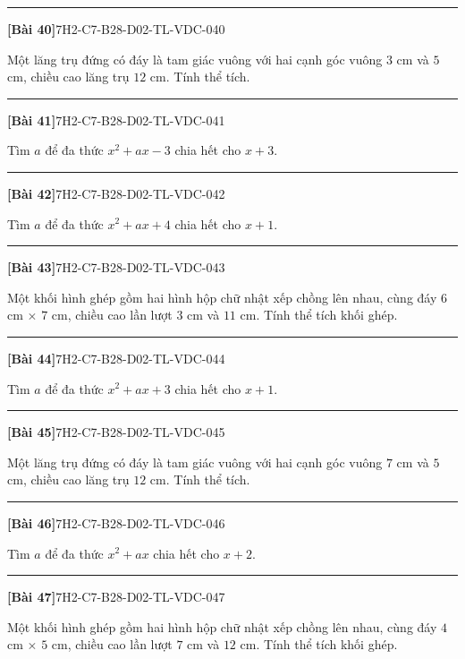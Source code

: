 \documentclass[12pt,a4paper]{article}
\newif\ifloigiai
\newenvironment{cauhoi}[2]{%
  \par\medskip\noindent\rule{\textwidth}{0.4pt}\par\nopagebreak
  \noindent\textbf{[#1]}\hfill{\scriptsize\ttfamily #2}\par\nopagebreak\smallskip}{\par}
\newcommand{\loigiai}[1]{\ifloigiai\par\smallskip\noindent\textit{Lời giải.} #1\par\fi}
\begin{document}
\begin{cauhoi}{Bài 40}{7H2-C7-B28-D02-TL-VDC-040}
Một lăng trụ đứng có đáy là tam giác vuông với hai cạnh góc vuông $3$ cm và $5$ cm, chiều cao lăng trụ $12$ cm. Tính thể tích.
\loigiai{Diện tích đáy là $\dfrac{3\cdot 5}{2}=7,5$ ($\text{cm}^2$). Thể tích là $7,5\cdot 12=90$ ($\text{cm}^3$).}
\end{cauhoi}
\begin{cauhoi}{Bài 41}{7H2-C7-B28-D02-TL-VDC-041}
Tìm $a$ để đa thức $x^{2}+ax-3$ chia hết cho $x+3$.
\loigiai{Đa thức chia hết cho $x+3$ khi $x=-3$ là nghiệm: $9-3a-3=0$, suy ra $a=2$.}
\end{cauhoi}
\begin{cauhoi}{Bài 42}{7H2-C7-B28-D02-TL-VDC-042}
Tìm $a$ để đa thức $x^{2}+ax+4$ chia hết cho $x+1$.
\loigiai{Đa thức chia hết cho $x+1$ khi $x=-1$ là nghiệm: $1-a+4=0$, suy ra $a=5$.}
\end{cauhoi}
\begin{cauhoi}{Bài 43}{7H2-C7-B28-D02-TL-VDC-043}
Một khối hình ghép gồm hai hình hộp chữ nhật xếp chồng lên nhau, cùng đáy $6$ cm $\times$ $7$ cm, chiều cao lần lượt $3$ cm và $11$ cm. Tính thể tích khối ghép.
\loigiai{Thể tích hai khối là $6\cdot 7\cdot 3=126$ và $6\cdot 7\cdot 11=462$ ($\text{cm}^3$). Thể tích khối ghép là $126+462=588$ ($\text{cm}^3$).}
\end{cauhoi}
\begin{cauhoi}{Bài 44}{7H2-C7-B28-D02-TL-VDC-044}
Tìm $a$ để đa thức $x^{2}+ax+3$ chia hết cho $x+1$.
\loigiai{Đa thức chia hết cho $x+1$ khi $x=-1$ là nghiệm: $1-a+3=0$, suy ra $a=4$.}
\end{cauhoi}
\begin{cauhoi}{Bài 45}{7H2-C7-B28-D02-TL-VDC-045}
Một lăng trụ đứng có đáy là tam giác vuông với hai cạnh góc vuông $7$ cm và $5$ cm, chiều cao lăng trụ $12$ cm. Tính thể tích.
\loigiai{Diện tích đáy là $\dfrac{7\cdot 5}{2}=17,5$ ($\text{cm}^2$). Thể tích là $17,5\cdot 12=210$ ($\text{cm}^3$).}
\end{cauhoi}
\begin{cauhoi}{Bài 46}{7H2-C7-B28-D02-TL-VDC-046}
Tìm $a$ để đa thức $x^{2}+ax$ chia hết cho $x+2$.
\loigiai{Đa thức chia hết cho $x+2$ khi $x=-2$ là nghiệm: $4-2a=0$, suy ra $a=2$.}
\end{cauhoi}
\begin{cauhoi}{Bài 47}{7H2-C7-B28-D02-TL-VDC-047}
Một khối hình ghép gồm hai hình hộp chữ nhật xếp chồng lên nhau, cùng đáy $4$ cm $\times$ $5$ cm, chiều cao lần lượt $7$ cm và $12$ cm. Tính thể tích khối ghép.
\loigiai{Thể tích hai khối là $4\cdot 5\cdot 7=140$ và $4\cdot 5\cdot 12=240$ ($\text{cm}^3$). Thể tích khối ghép là $140+240=380$ ($\text{cm}^3$).}
\end{cauhoi}
\end{document}

